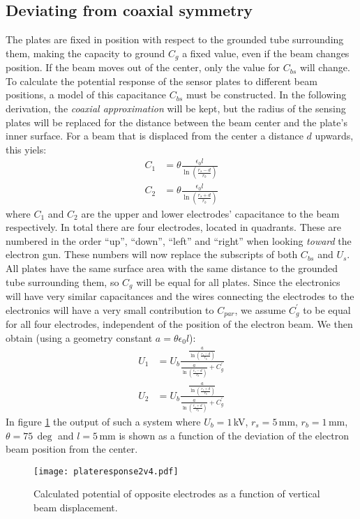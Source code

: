 \subsection{Deviating from coaxial symmetry}
\label{sec:theory/deviating}
The plates are fixed in position with respect to the grounded tube surrounding them, making the capacity to ground $C_g$ a fixed value, even if the beam changes position. If the beam moves out of the center, only the value for $C_{bs}$ will change.
To calculate the potential response of the sensor plates to different beam positions, a model of this capacitance $C_{bs}$ must be constructed.
In the following derivation, the \textit{coaxial approximation} will be kept, but the radius of the sensing plates will be replaced for the distance between the beam center and the plate's inner surface. For a beam that is displaced from the center a distance $d$ upwards, this yiels:
\begin{align}
C_1 &= \theta \frac{\epsilon_0l}{\ln\left(\frac{r_s-d}{r_b}\right)} \\
C_2 &= \theta \frac{\epsilon_0l}{\ln\left(\frac{r_s+d}{r_b}\right)}
\end{align}
where $C_1$ and $C_2$ are the upper and lower electrodes' capacitance to the beam respectively. In total there are four electrodes, located in quadrants. These are numbered in the order ``up'', ``down'', ``left'' and ``right'' when looking \textit{toward} the electron gun. These numbers will now replace the subscripts of both $C_{bs}$ and $U_s$.
All plates have the same surface area with the same distance to the grounded tube surrounding them, so $C_g$ will be equal for all plates. Since the electronics will have very similar capacitances and the wires connecting the electrodes to the electronics will have a very small contribution to $C_{par}$, we assume $C_g^\prime$ to be equal for all four electrodes, independent of the position of the electron beam.
We then obtain (using a geometry constant $a=\theta\epsilon_0l$):
\begin{align}
U_1 &= U_b\frac{\frac{a}{\ln\left(\frac{r_s-d}{r_b}\right)}}{\frac{a}{\ln\left(\frac{r_s-d}{r_b}\right)}+C_g^\prime} \\
U_2 &= U_b\frac{\frac{a}{\ln\left(\frac{r_s+d}{r_b}\right)}}{\frac{a}{\ln\left(\frac{r_s+d}{r_b}\right)}+C_g^\prime} \label{eq:plateresponse}
\end{align}
In figure \ref{fig:plateresponse} the output of such a system where $U_b = 1\,$kV, $r_s=5\,$mm, $r_b=1\,$mm, $\theta=75\,\deg$ and $l=5\,$mm is shown as a function of the deviation of the electron beam position from the center.
\begin{figure}[hb!]
\centering
\texttt{[image: plateresponse2v4.pdf]}
\caption{Calculated potential of opposite electrodes as a function of vertical beam displacement.}
\label{fig:plateresponse}
\end{figure}

